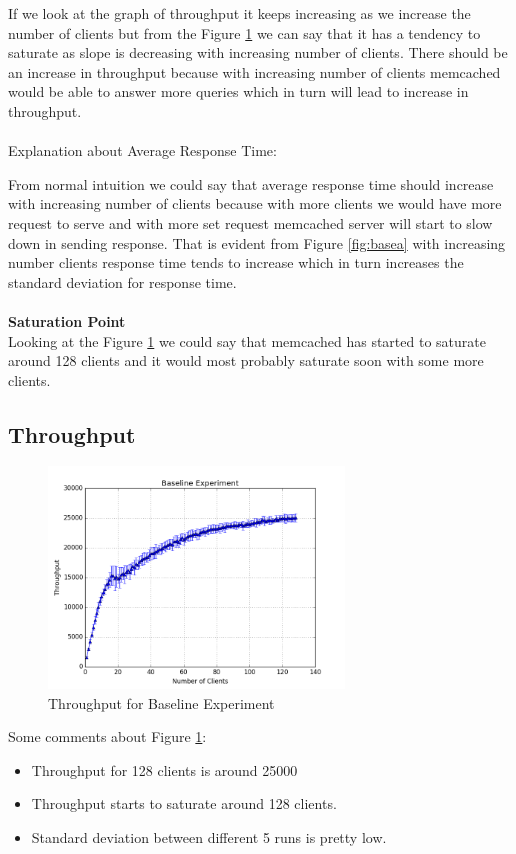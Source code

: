\documentclass[11pt]{article}
\begin{document}
If we look at the graph of throughput it keeps increasing as we increase the number of clients but from the Figure \ref{fig:baset} we can say that it has a tendency to saturate as slope is decreasing with increasing number of clients. There should be an increase in throughput because with increasing number of clients memcached would be able to answer more queries which in turn will lead to increase in throughput.
\\ \\
Explanation about Average Response Time:

From normal intuition we could say that average response time should increase with increasing number of clients because with more clients we would have more request to serve and with more set request memcached server will start to slow down in sending response. That is evident from Figure \ref{fig:basea} with increasing number clients response time tends to increase which in turn increases the standard deviation for response time.
\\ \\
\textbf{Saturation Point}
\\
Looking at the Figure \ref{fig:baset} we could say that memcached has started to saturate around 128 clients and it would most probably saturate soon with some more clients.


\subsection{Throughput}\label{sec:baseline:tput}
\begin{figure}[h!]
    \centering
    \includegraphics[width=0.7\textwidth]{base_throughput.png}
    \caption{Throughput for Baseline Experiment}
    \label{fig:baset}
\end{figure}
Some comments about Figure \ref{fig:baset}:
\begin{itemize}
	\item Throughput for 128 clients is around 25000
	\item Throughput starts to saturate around 128 clients.
	\item Standard deviation between different 5 runs is pretty low.
\end{itemize}
\end{document}
